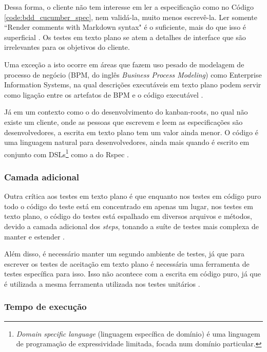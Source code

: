 Dessa forma, o cliente não tem interesse em ler a especificação como no Código \ref{code:bdd_cucumber_spec}, nem validá-la, muito menos escrevê-la. Ler somente ``Render comments with Markdown syntax" é o suficiente, mais do que isso é superficial \cite{WhyBotherWithCucumberTesting}. Os testes em texto plano se atem a detalhes de interface que são irrelevantes para os objetivos do cliente.

Uma exceção a isto ocorre em áreas que fazem uso pesado de modelagem de processo de negócio (BPM, do inglês \textit{Business Process Modeling})  como Enterprise Information Systems, na qual descrições executáveis em texto plano podem servir como ligação entre os artefatos de BPM e o código executável \cite{IntroducingBLDD}.

Já em um contexto como o do desenvolvimento do kanban-roots, no qual não existe um cliente, onde as pessoas que escrevem e leem as especificações são desenvolvedores, a escrita em texto plano tem um valor ainda menor. O código é uma linguagem natural para desenvolvedores, ainda mais quando é escrito em conjunto com DSLs\footnote{\textit{Domain specific language} (linguagem específica de domínio) é uma linguagem de programação de expressividade limitada, focada num domínio particular.}  como a do Rspec \cite{SteakOverCucumber}.


\subsubsection{Camada adicional}
\label{ssub:camada_adicional}

Outra crítica aos testes em texto plano é que enquanto nos testes em código puro todo o código do teste está em concentrado em apenas um lugar, nos testes em texto plano, o código do testes está espalhado em diversos arquivos e métodos, devido a camada adicional dos \textit{steps}, tonando a suíte de testes mais complexa de manter e estender \cite{SteakOverCucumber}.

Além disso, é necessário manter um segundo ambiente de testes, já que para escrever os testes de aceitação em texto plano é necessária uma ferramenta de testes específica para isso. Isso não acontece com a escrita em código puro, já que é utilizada a mesma ferramenta utilizada nos testes unitários \cite{WhyBotherWithCucumberTesting}.


\subsubsection{Tempo de execução}
\label{ssub:tempo_de_execucao}


